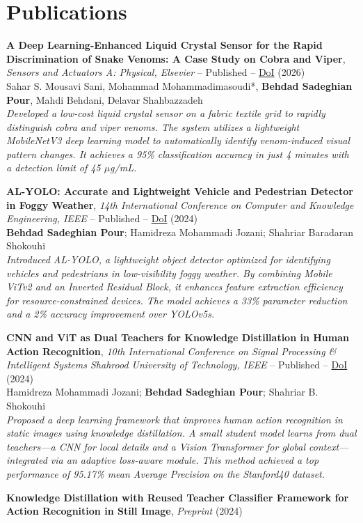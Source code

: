 \documentclass[10pt,a4paper]{article}
\begin{document}
	\section{Publications}
	
	\begin{enumerate}[label={[\arabic*]}]
		\item \textbf{A Deep Learning-Enhanced Liquid Crystal Sensor for the Rapid Discrimination of Snake Venoms: A Case Study on Cobra and Viper}, \textit{Sensors and Actuators A: Physical, Elsevier} -- Published -- \href{https://doi.org/10.1016/j.sna.2026.117779}{DoI} \hfill (2026) \\
		Sahar S. Mousavi Sani, Mohammad Mohammadimasoudi*, \textbf{Behdad Sadeghian Pour}, Mahdi Behdani, Delavar Shahbazzadeh \\
		\textit{Developed a low-cost liquid crystal sensor on a fabric textile grid to rapidly distinguish cobra and viper venoms. The system utilizes a lightweight MobileNetV3 deep learning model to automatically identify venom-induced visual pattern changes. It achieves a 95\% classification accuracy in just 4 minutes with a detection limit of 45 $\mu$g/mL.}
		
		\item \textbf{AL-YOLO: Accurate and Lightweight Vehicle and Pedestrian Detector in Foggy Weather}, \textit{14th International Conference on Computer and Knowledge Engineering, IEEE} -- Published -- \href{https://doi.org/10.1109/ICCKE65377.2024.10874685}{DoI} \hfill (2024) \\
		\textbf{Behdad Sadeghian Pour}; Hamidreza Mohammadi Jozani; Shahriar Baradaran Shokouhi \\
		\textit{Introduced AL-YOLO, a lightweight object detector optimized for identifying vehicles and pedestrians in low-visibility foggy weather. By combining Mobile ViTv2 and an Inverted Residual Block, it enhances feature extraction efficiency for resource-constrained devices. The model achieves a 33\% parameter reduction and a 2\% accuracy improvement over YOLOv5s.}
		
		\item \textbf{CNN and ViT as Dual Teachers for Knowledge Distillation in Human Action Recognition}, \textit{10th International Conference on Signal Processing \& Intelligent Systems Shahrood University of Technology, IEEE} -- Published -- \href{https://doi.org/10.1109/ICSPIS65223.2024.10931096}{DoI} \hfill (2024) \\
		Hamidreza Mohammadi Jozani; \textbf{Behdad Sadeghian Pour}; Shahriar B. Shokouhi \\
		\textit{Proposed a deep learning framework that improves human action recognition in static images using knowledge distillation. A small student model learns from dual teachers—a CNN for local details and a Vision Transformer for global context—integrated via an adaptive loss-aware module. This method achieved a top performance of 95.17\% mean Average Precision on the Stanford40 dataset.}
		
		\item \textbf{Knowledge Distillation with Reused Teacher Classifier Framework for Action Recognition in Still Image}, \textit{Preprint} \hfill (2024)
	\end{enumerate}
	
\end{document}
